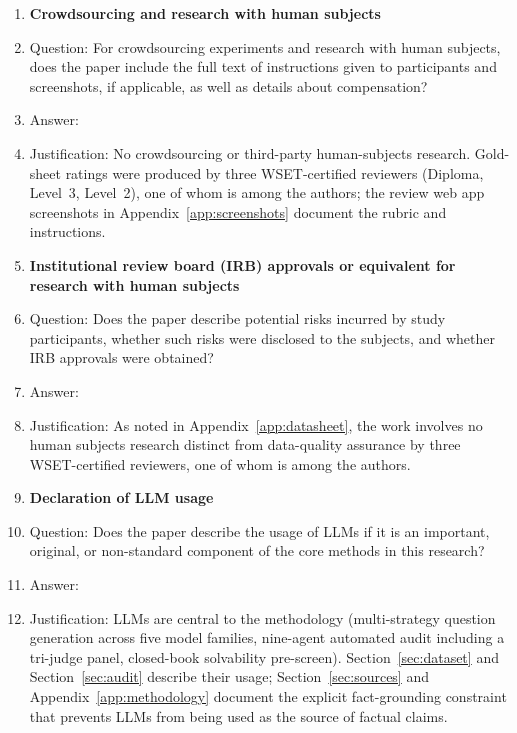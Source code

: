 \begin{enumerate}
\item {\bf Crowdsourcing and research with human subjects}
    \item[] Question: For crowdsourcing experiments and research with human subjects, does the paper include the full text of instructions given to participants and screenshots, if applicable, as well as details about compensation?
    \item[] Answer: \answerNA{}
    \item[] Justification: No crowdsourcing or third-party human-subjects research. Gold-sheet ratings were produced by three WSET-certified reviewers (Diploma, Level~3, Level~2), one of whom is among the authors; the review web app screenshots in Appendix~\ref{app:screenshots} document the rubric and instructions.

\item {\bf Institutional review board (IRB) approvals or equivalent for research with human subjects}
    \item[] Question: Does the paper describe potential risks incurred by study participants, whether such risks were disclosed to the subjects, and whether IRB approvals were obtained?
    \item[] Answer: \answerNA{}
    \item[] Justification: As noted in Appendix~\ref{app:datasheet}, the work involves no human subjects research distinct from data-quality assurance by three WSET-certified reviewers, one of whom is among the authors.

\item {\bf Declaration of LLM usage}
    \item[] Question: Does the paper describe the usage of LLMs if it is an important, original, or non-standard component of the core methods in this research?
    \item[] Answer: \answerYes{}
    \item[] Justification: LLMs are central to the methodology (multi-strategy question generation across five model families, nine-agent automated audit including a tri-judge panel, closed-book solvability pre-screen). Section~\ref{sec:dataset} and Section~\ref{sec:audit} describe their usage; Section~\ref{sec:sources} and Appendix~\ref{app:methodology} document the explicit fact-grounding constraint that prevents LLMs from being used as the source of factual claims.

\end{enumerate}
